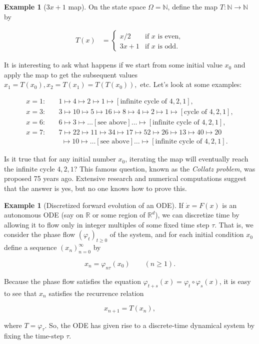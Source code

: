 \documentclass[11pt]{report}
\theoremstyle{plain}
\theoremstyle{definition}
\newtheorem{example}[thm]{Example}
\begin{document}
\begin{example}[$3x+1$ map]
On the state space $\Omega=\mathbb{N}$, define the
map $T:\mathbb{N}\to\mathbb{N}$ by

\begin{align*}
T(x) &= \begin{cases} x/2 & \textrm{if $x$ is even}, \\ 3x+1 & \textrm{if $x$ is odd}.
\end{cases}
\end{align*}

It is interesting to ask what happens if we start
from some initial value $x_0$ and apply the map to
get the subsequent values
$x_1=T(x_0), x_2=T(x_1)=T(T(x_0)),$ etc. Let's look
at some examples:

\begin{align*}
x=1: \quad & 1\mapsto 4 \mapsto 2 \mapsto 1 \mapsto [\textrm{infinite cycle of }4,2,1], \\
x=3: \quad & 3\mapsto 10\mapsto 5\mapsto 16\mapsto 8 \mapsto 4 \mapsto2\mapsto 1 \mapsto
[\textrm{cycle of }4,2,1], \\
x=6: \quad & 6 \mapsto 3 \mapsto \ldots[\textrm{see above}] \ldots \mapsto [\textrm{infinite cycle of }4,2,1], \\
x=7: \quad & 7 \mapsto 22\mapsto 11\mapsto 34\mapsto 17\mapsto 52\mapsto 26\mapsto13\mapsto40
\mapsto20 \\ & \ \,\mapsto10\mapsto \ldots[\textrm{see above}] \ldots \mapsto [\textrm{infinite cycle of }4,2,1].
\end{align*}

Is it true that for any initial number $x_0$,
iterating the map will eventually reach the infinite
cycle $4,2,1$? This famous question, known as the
\emph{Collatz problem}, was proposed 75 years ago.
Extensive research and numerical computations suggest
that the answer is yes, but no one knows how to prove
this.
\end{example}

\begin{example}[Discretized forward evolution of an ODE]
If $\dot{x}=F(x)$ is an autonomous ODE (say on
$\mathbb{R}$ or some region of $\mathbb{R}^d$), we
can discretize time by allowing it to flow only in
integer multiples of some fixed time step $\tau$.
That is, we consider the phase flow
$(\varphi_t)_{t\ge 0}$ of the system, and for each
initial condition $x_0$ define a sequence
$(x_n)_{n=0}^\infty$ by

\[
x_n = \varphi_{n\tau}(x_0) \qquad (n\ge 1).
\]

Because the phase flow satisfies the equation
$\varphi_{t+s}(x)=\varphi_t\circ \varphi_s(x)$, it is
easy to see that $x_n$ satisfies the recurrence
relation

\[
x_{n+1} = T(x_n),
\]

where $T = \varphi_\tau$. So, the ODE has given rise
to a discrete-time dynamical system by fixing the
time-step $\tau$.
\end{example}
\end{document}
